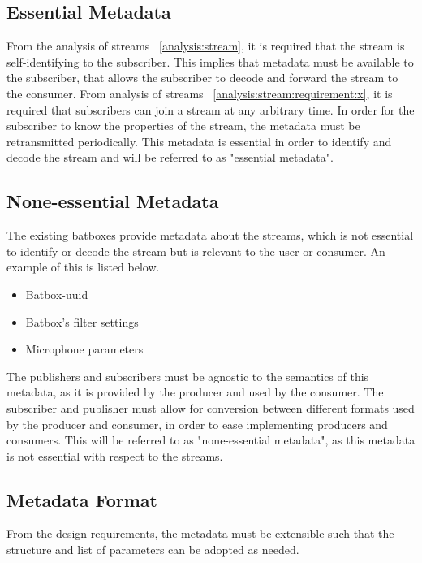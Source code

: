 \subsection{Essential Metadata}
From the analysis of streams ~\ref{analysis:stream}, it is required that the stream is self-identifying to the subscriber. This implies that metadata must be available to the subscriber, that allows the subscriber to decode and forward the stream to the consumer. 
From analysis of streams ~\ref{analysis:stream:requirement:x}, it is required that subscribers can join a stream at any arbitrary time. In order for the subscriber to know the properties of the stream, the metadata must be retransmitted periodically. This metadata is essential in order to identify and decode the stream and will be referred to as "essential metadata".\\

\subsection{None-essential Metadata}
The existing batboxes provide metadata about the streams, which is not essential to identify or decode the stream but is relevant to the user or consumer. An example of this is listed below.
\begin{itemize}
	\item Batbox-uuid
	\item Batbox's filter settings
	\item Microphone parameters
\end{itemize} 
The publishers and subscribers must be agnostic to the semantics of this metadata, as it is provided by the producer and used by the consumer. The subscriber and publisher must allow for conversion between different formats used by the producer and consumer, in order to ease implementing producers and consumers.
This will be referred to as "none-essential metadata", as this metadata is not essential with respect to the streams.\\

\subsection{Metadata Format}
From the design requirements, the metadata must be extensible such that the structure and list of parameters can be adopted as needed.

